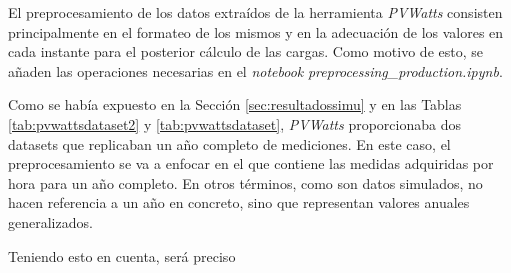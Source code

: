 El preprocesamiento de los datos extraídos de la herramienta \textit{PVWatts} consisten principalmente en el formateo de los mismos y en la adecuación de los valores en cada instante para el posterior cálculo de las cargas. Como motivo de esto, se añaden las operaciones necesarias en el \textit{notebook} \textit{preprocessing\_production.ipynb}. 

\vspace{3mm}

Como se había expuesto en la Sección \ref{sec:resultadossimu} y en las Tablas \ref{tab:pvwattsdataset2} y \ref{tab:pvwattsdataset}, \textit{PVWatts} proporcionaba dos datasets que replicaban un año completo de mediciones. En este caso, el preprocesamiento se va a enfocar en el que contiene las medidas adquiridas por hora para un año completo. En otros términos, como son datos simulados, no hacen referencia a un año en concreto, sino que representan valores anuales generalizados. 


Teniendo esto en cuenta, será preciso 

\vspace{3mm}











